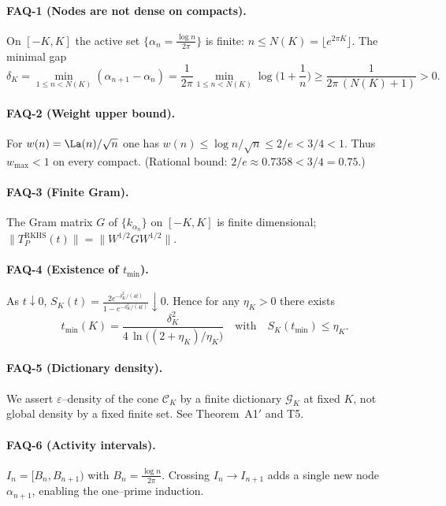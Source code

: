 \paragraph{FAQ-1 (Nodes are not dense on compacts).} On $[-K,K]$ the active set $\{\alpha_n=\tfrac{\log n}{2\pi}\}$ is finite: $n\le N(K)=\lfloor e^{2\pi K}\rfloor$. The minimal gap
\begin{equation}\label{eq:FAQ_critical_points-formula-1}
\delta_K=\min_{1\le n<N(K)}(\alpha_{n+1}-\alpha_n)=\frac{1}{2\pi}\min_{1\le n<N(K)}\log\Big(1+\frac1n\Big)\ge \frac{1}{2\pi\,(N(K)+1)} > 0.
\end{equation}
\paragraph{FAQ-2 (Weight upper bound).} For $w(n)=\La(n)/\sqrt n$ one has $w(n)\le \log n/\sqrt n\le 2/e< 3/4 <1$. Thus $w_{\max}<1$ on every compact. (Rational bound: $2/e\approx 0.7358 < 3/4 = 0.75$.)
\paragraph{FAQ-3 (Finite Gram).} The Gram matrix $G$ of $\{k_{\alpha_n}\}$ on $[-K,K]$ is finite dimensional; $\|T_P^{\mathrm{RKHS}}(t)\|=\|W^{1/2}GW^{1/2}\|$.
\paragraph{FAQ-4 (Existence of $t_{\min}$).} As $t\downarrow 0$, $S_K(t)=\tfrac{2e^{-\delta_K^2/(4t)}}{1-e^{-\delta_K^2/(4t)}}\downarrow0$. Hence for any $\eta_K>0$ there exists
\begin{equation}\label{eq:FAQ_critical_points-formula}
t_{\min}(K)=\frac{\delta_K^2}{4\,\ln\!\bigl((2+\eta_K)/\eta_K\bigr)}\quad\text{with}\quad S_K(t_{\min})\le \eta_K.
\end{equation}
\paragraph{FAQ-5 (Dictionary density).} We assert $\varepsilon$--density of the cone $\mathcal C_K$ by a finite dictionary $\mathcal G_K$ at fixed $K$, not global density by a fixed finite set. See Theorem~A1$'$ and T5.
\paragraph{FAQ-6 (Activity intervals).} $I_n=[B_n,B_{n+1})$ with $B_n=\tfrac{\log n}{2\pi}$. Crossing $I_n\to I_{n+1}$ adds a single new node $\alpha_{n+1}$, enabling the one--prime induction.
